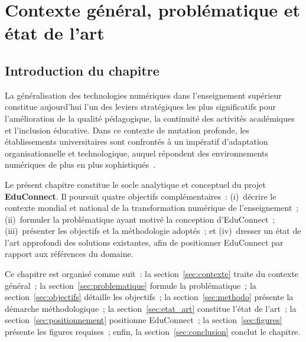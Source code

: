 
\chapter{Contexte g\'en\'eral, probl\'ematique et \'etat de l'art}

\section{Introduction du chapitre}

La g\'en\'eralisation des technologies num\'eriques dans l'enseignement sup\'erieur constitue aujourd'hui l'un des leviers strat\'egiques les plus significatifs pour l'am\'elioration de la qualit\'e p\'edagogique, la continuit\'e des activit\'es acad\'emiques et l'inclusion \'educative. Dans ce contexte de mutation profonde, les \'etablissements universitaires sont confront\'es \`a un imp\'eratif d'adaptation organisationnelle et technologique, auquel r\'epondent des environnements num\'eriques de plus en plus sophistiqu\'es~\cite{unesco_digital_2026,worldbank_edtech_2026}.

Le pr\'esent chapitre constitue le socle analytique et conceptuel du projet \textbf{EduConnect}. Il poursuit quatre objectifs compl\'ementaires~: (i)~d\'ecrire le contexte mondial et national de la transformation num\'erique de l'enseignement~; (ii)~formuler la probl\'ematique ayant motiv\'e la conception d'EduConnect~; (iii)~pr\'esenter les objectifs et la m\'ethodologie adopt\'es~; et (iv)~dresser un \'etat de l'art approfondi des solutions existantes, afin de positionner EduConnect par rapport aux r\'ef\'erences du domaine.

Ce chapitre est organis\'e comme suit~: la section~\ref{sec:contexte} traite du contexte g\'en\'eral~; la section~\ref{sec:problematique} formule la probl\'ematique~; la section~\ref{sec:objectifs} d\'etaille les objectifs~; la section~\ref{sec:methodo} pr\'esente la d\'emarche m\'ethodologique~; la section~\ref{sec:etat_art} constitue l'\'etat de l'art~; la section~\ref{sec:positionnement} positionne EduConnect~; la section~\ref{sec:figures} pr\'esente les figures requises~; enfin, la section~\ref{sec:conclusion} conclut le chapitre.

